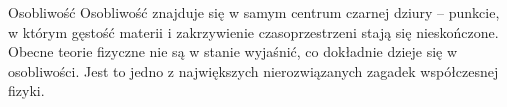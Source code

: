 \begin{frame}{Osobliwość}
Osobliwość znajduje się w samym centrum czarnej dziury – punkcie, w którym gęstość materii i zakrzywienie czasoprzestrzeni stają się nieskończone. Obecne teorie fizyczne nie są w stanie wyjaśnić, co dokładnie dzieje się w osobliwości. Jest to jedno z największych nierozwiązanych zagadek współczesnej fizyki.
\end{frame}
